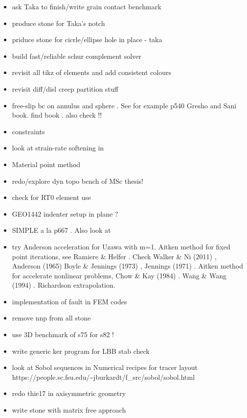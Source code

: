 \documentclass[a4paper]{article}
\begin{document}
\begin{itemize}
\item ask Taka to finish/write grain contact benchmark
\item produce stone for Taka's notch
\item priduce stone for cicrle/ellipse hole in place - taka
\item build fast/reliable schur complement solver
\item revisit all tikz of elements and add consistent colours
\item revisit diff/disl creep partition stuff
\item free-slip bc on annulus and sphere . See for example p540 Gresho and Sani book. find book \cite{deab72}.
also check \cite{ensg82} !!
\item constraints \cite{absh79}
\item look at strain-rate softening in \cite{belz02}
\item Material point method \cite{sucs94,susc96,susp07}
\item redo/explore dyn topo bench of \cite{bore19} MSc thesis!
\item check \cite{bufm19} for RT0 element use
\item GEO1442 indenter setup in plane ?
\item SIMPLE a la p667 \cite{john16}. Also look at \cite{vusb00} 
\item try Anderson acceleration for Uzawa \cite{hoow17} with m=1. Aitken method for 
fixed point iterations, see Ramiere \& Helfer \cite{rahe15}.
Check Walker \& Ni (2011) \cite{wani11}, Anderson (1965) \cite{ande65}
Boyle \& Jennings (1973) \cite{boje73}, Jennings (1971) \cite{jenn71}.
Aitken method for accelerate nonlinear problems, Chow \& Kay (1984) \cite{chka84}.
Wang \& Wang (1994) \cite{wawa94}. Richardson extrapolation. 
\item implementation of fault in FEM codes \cite{zhgu94,zhgu95}
\item remove nnp from all stone
\item use 3D benchmark of s75 for s82 !
\item write generic ker program for LBB stab check
\item look at Sobol sequences in Numerical recipes for tracer layout\\
https://people.sc.fsu.edu/\~{}jburkardt/f\_src/sobol/sobol.html
\item redo thie17 in axisymmetric geometry

\item write stone with matrix free approach

\end{itemize}
\end{document}
